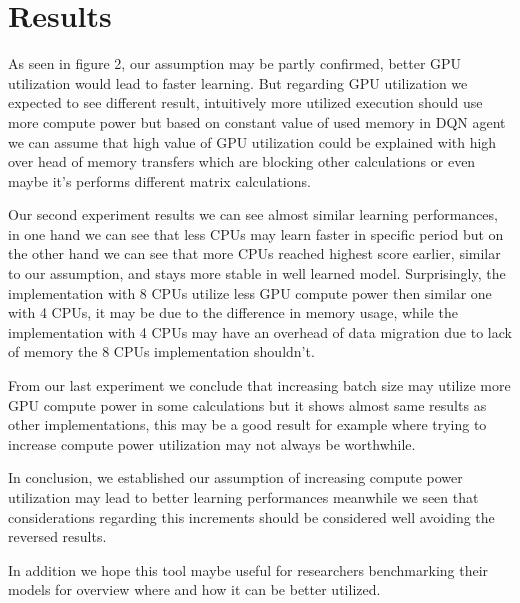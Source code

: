 \documentclass[11 pt, twocolumn]{article}
\begin{document}
\section{Results}
As seen in figure 2, our assumption may be partly confirmed, better GPU utilization would lead to faster learning. But regarding GPU utilization we expected to see different result, intuitively more utilized execution should use more compute power but based on constant value of used memory in DQN agent we can assume that high value of GPU utilization could be explained with high over head of memory transfers which are blocking other calculations or even maybe it's performs different matrix calculations.


Our second experiment results we can see almost similar learning performances, in one hand we can see that less CPUs may learn faster in specific period but on the other hand we can see that more CPUs reached highest score earlier, similar to our assumption, and stays more stable in well learned model. Surprisingly, the implementation with 8 CPUs utilize less GPU compute power then similar one with 4 CPUs, it may be due to the difference in memory usage, while the implementation with 4 CPUs may have an overhead of data migration due to lack of memory the 8 CPUs implementation shouldn't.


From our last experiment we conclude that increasing batch size may utilize more GPU compute power in some calculations but it shows almost same results as other implementations, this may be a good result for example where trying to increase compute power utilization may not always be worthwhile.


In conclusion, we established our assumption of increasing compute power utilization may lead to better learning performances meanwhile we seen that considerations regarding this increments should be considered well avoiding the reversed results.


In addition we hope this tool maybe useful for researchers benchmarking their models for overview where and how it can be better utilized.


%
%
%
%
%


\end{document}
